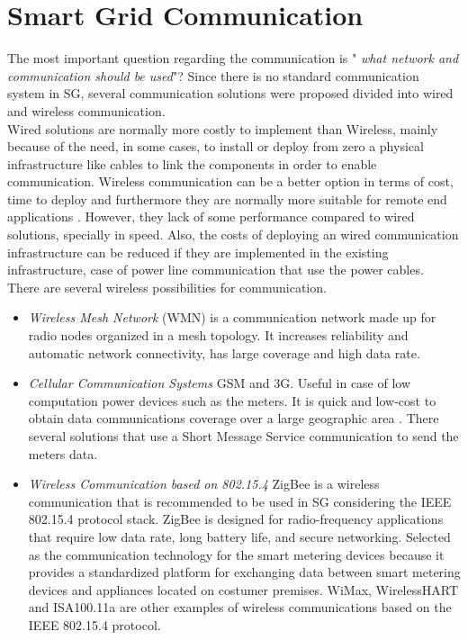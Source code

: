 \section{Smart Grid Communication}
The most important question regarding the communication is "\textit{ what network and communication should be used}"\cite{journals/comsur/FangMXY12}? Since there is no standard communication system in SG, several communication solutions were proposed divided into wired and wireless communication.\\
Wired solutions are normally more costly to implement than Wireless, mainly because of the need, in some cases, to install or deploy from zero a physical infrastructure like cables to link the components in order to enable communication.  Wireless communication can be a better option in terms of cost, time to deploy and furthermore they are normally more suitable for remote end applications \cite{parikh2010opportunities}. However, they lack of some performance compared to wired solutions, specially in speed. Also, the costs of deploying an wired communication infrastructure can be reduced if they are implemented in the existing infrastructure, case of power line communication that use the power cables.\\
There are several wireless possibilities for communication.\\
\begin{itemize}
  \item \textit{Wireless Mesh Network} (WMN) is a communication network made up for radio nodes organized in a mesh topology\cite{journals/comsur/FangMXY12}. It increases reliability and automatic network connectivity, has large coverage and high data rate.
\item \textit{Cellular Communication Systems}  GSM and 3G. Useful in case of low computation power devices such as the meters. It is quick and low-cost to obtain data communications coverage over a large geographic area \cite{akyol2010survey}. There several solutions that use a Short Message Service communication to send the meters data.
\item \textit{Wireless Communication based on 802.15.4} ZigBee is a wireless communication that is recommended to be used in SG considering the IEEE 802.15.4 protocol stack\cite{parikh2010opportunities}. ZigBee is designed for radio-frequency applications that require low data rate, long battery life, and secure networking. Selected as the communication technology for the smart metering devices\cite{farhangi2010path} because it provides a standardized platform for exchanging data between smart metering devices and appliances located on costumer  premises\cite{journals/comsur/FangMXY12}.  WiMax, WirelessHART and ISA100.11a are other examples of wireless communications based on the IEEE 802.15.4 protocol.
\end{itemize}
